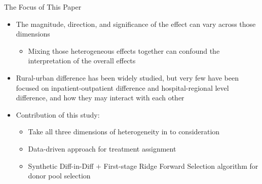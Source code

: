 \documentclass{beamer}
\theoremstyle{definition}
\begin{document}
\begin{frame}{The Focus of This Paper}

\begin{itemize}
    \setlength{\itemsep}{16pt} %
    \item The magnitude, direction, and significance of the effect can vary across those dimensions
    \begin{itemize}
        \setlength{\itemsep}{8pt}
        \item Mixing those heterogeneous effects together can confound the interpretation of the overall effects %
    \end{itemize}
    
    \item Rural-urban difference has been widely studied, but very few have been focused on inpatient-outpatient difference and hospital-regional level difference, and how they may interact with each other

    \item Contribution of this study:

    \begin{itemize}
        \setlength{\itemsep}{8pt}
        \item Take all three dimensions of heterogeneity in to consideration 
        \item Data-driven approach for treatment assignment %
        \item Synthetic Diff-in-Diff $+$ First-stage Ridge Forward Selection algorithm for donor pool selection
    \end{itemize}
\end{itemize}

    
\end{frame}
\end{document}
